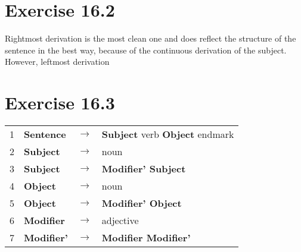 \documentclass[11pt]{article} %
\begin{document}
\section*{Exercise 16.2}
Rightmost derivation is the most clean one and does reflect the structure of the sentence in the best way, because of the continuous derivation of the subject. However, leftmost derivation

\section*{Exercise 16.3}
\begin{tabular}{llcl}
1
& \textbf{Sentence}
& $\rightarrow$
& \textbf{Subject} verb \textbf{Object} endmark	\\

2
& \textbf{Subject}
& $\rightarrow$
& noun \\

3
& \textbf{Subject}
& $\rightarrow$
& \textbf{Modifier' Subject} \\

4
& \textbf{Object}
& $\rightarrow$
& noun \\

5
& \textbf{Object}
& $\rightarrow$
& \textbf{Modifier' Object} \\

6
& \textbf{Modifier}
& $\rightarrow$
& adjective \\

7
& \textbf{Modifier'}
& $\rightarrow$
& \textbf{Modifier Modifier'} \\

\end{tabular}

\fi
\end{document}

